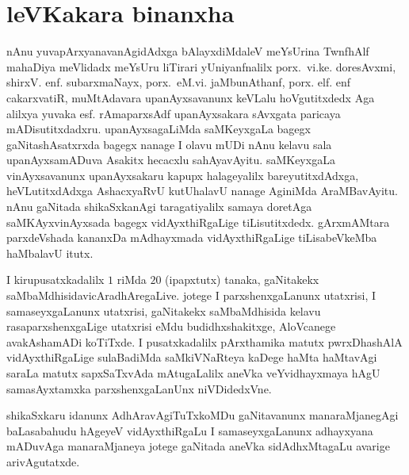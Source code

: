 {
\makeatletter
\def\@makechapterhead#1{%
  \vspace*{5\p@}%
  {\parindent \z@ \raggedright \normalfont
    \ifnum \c@secnumdepth >\m@ne
      \if@mainmatter
        \Huge\bfseries \@chapapp\space\thechapter
        \vskip 4pt
        \par\nobreak
        \vskip 5\p@
      \fi
    \fi
    \interlinepenalty\@M
    \Huge\bfseries #1\par\nobreak
    \vskip 15\p@
  }}
  \makeatother
 \chapter{leVKakara binanxha}


\qquad nAnu yuvapArxyanavanAgidAdxga  bAlayxdiMdaleV meYsUrina TwnfhAlf mahaDiya meVlidadx meYsUru liTirari yUniyanfnalilx porx.~vi.ke. doresAvxmi, shirxV. enf. subarxmaNayx, porx.~eM.vi. jaMbunAthanf, porx. elf. enf cakarxvatiR, muMtAdavara upanAyxsavanunx keVLalu hoVgutitxdedx Aga alilxya yuvaka esf. rAmaparxsAdf upanAyxsakara sAvxgata paricaya mADisutitxdadxru.  upanAyxsagaLiMda saMKeyxgaLa bagegx gaNitashAsatxrxda bagegx nanage I olavu mUDi nAnu kelavu sala upanAyxsamADuva Asakitx hecacxlu sahAyavAyitu. saMKeyxgaLa vinAyxsavanunx upanAyxsakaru kapupx halageyalilx bareyutitxdAdxga, heVLutitxdAdxga AshacxyaRvU kutUhalavU nanage AginiMda AraMBavAyitu. nAnu gaNitada shikaSxkanAgi taragatiyalilx samaya doretAga saMKAyxvinAyxsada bagegx vidAyxthiRgaLige tiLisutitxdedx. gArxmAMtara parxdeVshada kananxDa mAdhayxmada vidAyxthiRgaLige tiLisabeVkeMba haMbalavU itutx.

 I kirupusatxkadalilx $1$ riMda $20$ (ipapxtutx) tanaka, gaNitakekx saMbaMdhisida\break vicAradhAregaLive. jotege I parxshenxgaLanunx utatxrisi, I samaseyxgaLanunx utatxrisi, gaNitakekx saMbaMdhisida kelavu rasaparxshenxgaLige utatxrisi eMdu budidhxshakitxge, AloVcanege avakAshamADi koTiTxde. I pusatxkadalilx pArxthamika matutx pwrxDhashAlA vidAyxthiRgaLige sulaBadiMda saMkiVNaRteya kaDege haMta haMtavAgi saraLa matutx sapxSaTxvAda mAtugaLalilx aneVka veYvidhayxmaya hAgU samasAyxtamxka parxshenxgaLanUnx niVDidedxVne.

 shikaSxkaru idanunx AdhAravAgiTuTxkoMDu gaNitavanunx manaraMjanegAgi baLasa\-bahudu hAgeyeV vidAyxthiRgaLu I samaseyxgaLanunx adhayxyana mADuvAga manaraMjaneya jotege gaNitada aneVka sidAdhxMtagaLu avarige arivAgutatxde.

}
